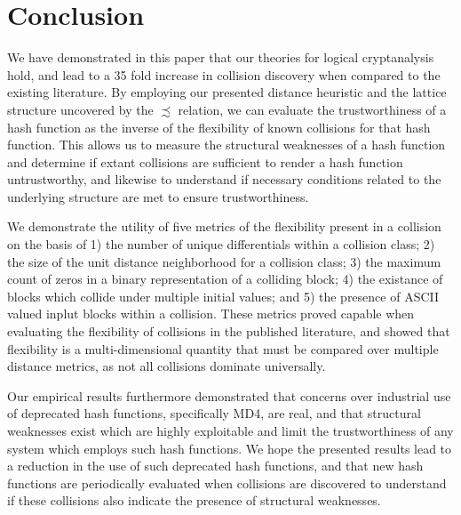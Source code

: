 \documentclass[conference]{IEEEtran}
\begin{document}




\section{Conclusion} \label{Sec:Conclusion}

We have demonstrated in this paper that our theories for logical
cryptanalysis hold, and lead to a 35 fold increase in collision
discovery when compared to the existing literature.  By employing our
presented distance heuristic and the lattice structure uncovered by
the $\precsim$ relation, we can evaluate the trustworthiness of a hash
function as the inverse of the flexibility of known collisions for
that hash function.  This allows us to measure the structural
weaknesses of a hash function and determine if extant collisions are sufficient
to render a hash function untrustworthy, and likewise to understand if
necessary conditions related to the underlying structure are met to
ensure trustworthiness.

We demonstrate the utility of five metrics of the flexibility present
in a collision on the basis of 1) the number of unique differentials
within a collision class; 2) the size of the unit distance
neighborhood for a collision class; 3) the maximum count of zeros in a
binary representation of a colliding block; 4) the existance of blocks
which collide under multiple initial values; and 5) the presence of
ASCII valued inplut blocks within a collision.  These metrics proved
capable when evaluating the flexibility of collisions in the published
literature, and showed that flexibility is a multi-dimensional
quantity that must be compared over multiple distance metrics, as not all
collisions dominate universally.

Our empirical results furthermore demonstrated that concerns over
industrial use of deprecated hash functions, specifically MD4, are
real, and that structural weaknesses exist which are highly
exploitable and limit the trustworthiness of any system which employs
such hash functions.  We hope the presented results lead to a
reduction in the use of such deprecated hash functions, and that new
hash functions are periodically evaluated when collisions are
discovered to understand if these collisions also indicate the
presence of structural weaknesses.
\end{document}
